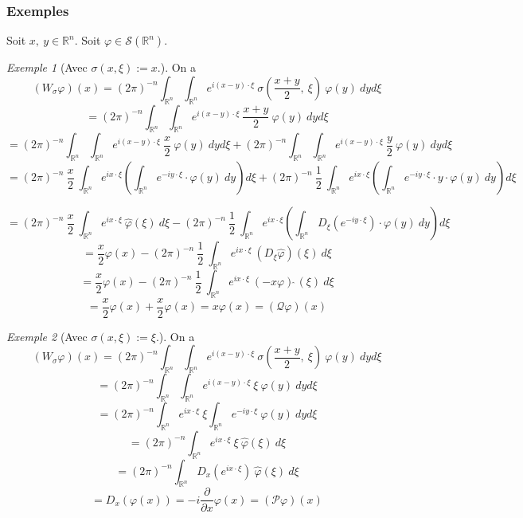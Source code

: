 \documentclass[a4paper, 12pt]{report}
\newcommand{\R}{\mathbb{R}} %
\renewcommand{\.}{\cdot} %
\theoremstyle{break}
\theoremstyle{remark}
\newtheorem{exemple}{Exemple}
\theoremstyle{proofstyle}
\begin{document}
\subsubsection{Exemples}
Soit $x,~y \in \R^n$. Soit $\varphi \in \mathcal{S}(\R^n)$.

\begin{exemple}[Avec $\sigma (x, \xi) := x$.]
    On a
    $$(W_\sigma \varphi)(x)=(2 \pi)^{-n} \int_{\R^n} \int_{\R^n} e^{i(x-y) \. \xi}~ \sigma\left(\frac{x+y}{2}, ~\xi\right) ~ \varphi(y) ~dy d\xi$$
    $$= (2 \pi)^{-n} \int_{\R^n} \int_{\R^n} e^{i(x-y) \. \xi} ~ \frac{x+y}{2} ~ \varphi(y) ~dy d\xi$$
    $$= (2 \pi)^{-n} \int_{\R^n} \int_{\R^n} e^{i(x-y) \. \xi} ~ \frac{x}{2} ~ \varphi(y) ~dy d\xi + (2 \pi)^{-n} \int_{\R^n} \int_{\R^n} e^{i(x-y) \. \xi} ~ \frac{y}{2} ~ \varphi(y) ~dy d\xi$$
    $$= (2 \pi)^{-n} ~ \frac{x}{2} ~ \int_{\R^n} e^{ix \. \xi} \left( \int_{\R^n} e^{-iy \. \xi} \. \varphi(y) ~dy\right) d\xi + (2 \pi)^{-n} ~ \frac{1}{2} ~\int_{\R^n} e^{ix \. \xi} \left(\int_{\R^n} e^{-iy \. \xi} \. y \. \varphi(y) ~dy \right) d\xi$$

    $$= (2 \pi)^{-n} ~ \frac{x}{2} ~ \int_{\R^n} e^{ix \. \xi} ~ \hat{\varphi}(\xi) ~ d\xi - (2 \pi)^{-n} ~ \frac{1}{2} ~\int_{\R^n} e^{ix \. \xi} \left(\int_{\R^n} D_\xi( e^{-iy \. \xi}) \. \varphi(y) ~dy \right) d\xi$$
    $$= \frac{x}{2} \varphi(x) - (2 \pi)^{-n} ~ \frac{1}{2} ~\int_{\R^n} e^{ix \. \xi}~ (D_\xi\hat{\varphi})(\xi) ~ d\xi$$
    $$= \frac{x}{2} \varphi(x) - (2 \pi)^{-n} ~ \frac{1}{2} ~\int_{\R^n} e^{ix \. \xi}~ (-x \varphi)\hat{~}(\xi) ~ d\xi$$
    $$= \frac{x}{2} \varphi(x) + \frac{x}{2}\varphi(x) = x \varphi(x) = (\mathcal{Q} \varphi)(x)$$
\end{exemple}

\begin{exemple}[Avec $\sigma (x, \xi) := \xi$.]
    On a
    $$(W_\sigma \varphi)(x)=(2 \pi)^{-n} \int_{\R^n} \int_{\R^n} e^{i(x-y) \. \xi}~ \sigma(\frac{x+y}{2}, ~\xi) ~ \varphi(y) ~dy d\xi$$
    $$= (2 \pi)^{-n} \int_{\R^n} \int_{\R^n} e^{i(x-y) \. \xi} ~ \xi ~ \varphi(y) ~dy d\xi$$
    $$= (2 \pi)^{-n} \int_{\R^n} e^{ix\.\xi} ~ \xi \int_{\R^n} e^{-iy \. \xi} ~ \varphi(y) ~dy d\xi$$
    $$= (2 \pi)^{-n} \int_{\R^n} e^{ix\.\xi} ~ \xi ~ \hat{\varphi}(\xi) ~d\xi$$
    $$= (2 \pi)^{-n} \int_{\R^n} D_x(e^{ix\.\xi}) ~ \hat{\varphi}(\xi) ~d\xi$$
    $$= D_x(\varphi(x)) = -i \frac{\partial}{\partial x} \varphi(x) = (\mathcal{P}\varphi)(x)$$
\end{exemple}
\end{document}
